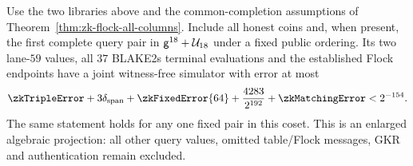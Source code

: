 \begin{theorem}\label{thm:zk-flock-pair-interface}
Use the two libraries above and the common-completion assumptions of Theorem~\ref{thm:zk-flock-all-columns}. Include all honest coins and, when present, the first complete query pair in $\mathsf{g}^{18}+\mathcal{U}_{18}$ under a fixed public ordering. Its two lane-$59$ values, all $37$ BLAKE2s terminal evaluations and the established Flock endpoints have a joint witness-free simulator with error at most
\[
 \zkTripleError+3\delta_{\mathrm{span}}+\zkFixedError{64}
 +\frac{4283}{2^{192}}+\zkMatchingError<2^{-154}.
\]
The same statement holds for any one fixed pair in this coset. This is an enlarged algebraic projection: all other query values, omitted table/Flock messages, GKR and authentication remain excluded.
\end{theorem}
